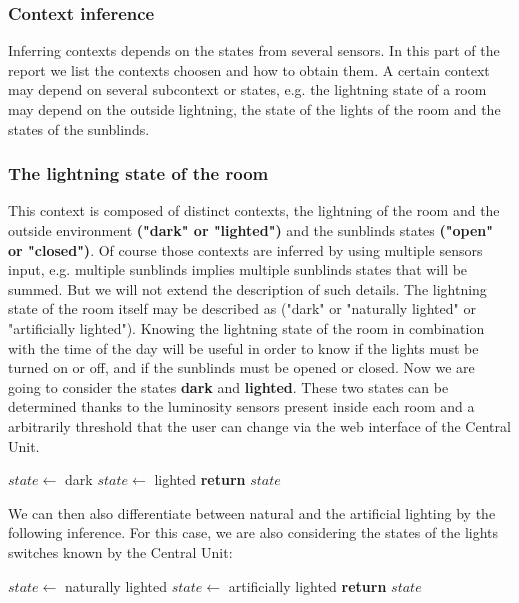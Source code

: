 \documentclass{acm_proc_article-sp}
\begin{document}
\subsubsection{Context inference}
Inferring contexts depends on the states from several sensors. In this part of the report we list the contexts choosen and how to obtain them.
A certain context may depend on several subcontext or states, 
e.g. the lightning state of a room may depend on the outside lightning, the state of the lights of the room and the states of the sunblinds.
\subsubsection*{The lightning state of the room}
 This context is composed of distinct contexts, the lightning of the room and the outside environment \textbf{("dark" or "lighted")} and the sunblinds states \textbf{("open" or "closed")}. 
 Of course those contexts are inferred by using multiple sensors input, e.g. multiple sunblinds implies multiple sunblinds states that will be summed. But we will not extend the description of such details.
 The lightning state of the room itself may be described as ("dark" or "naturally lighted" or "artificially lighted").
 Knowing the lightning state of the room in combination with the time of the day will be useful in order to know if the lights must be turned on or off, and if the sunblinds must be opened or closed. Now we are going to consider the states \textbf{dark} and \textbf{lighted}. These two states can be determined thanks to the luminosity sensors present inside each room and a arbitrarily threshold that the user can change via the web interface of the Central Unit.
 \begin{description}
  \begin{algorithm}
  \begin{algorithmic}
      \State $state\gets$ dark
    \Else
      \State $state\gets$ lighted
  \EndIf
  \State \textbf{return} $state$
  \end{algorithmic}
  \end{algorithm}
\end{description}
We can then also differentiate between natural and the artificial lighting by the following inference. For this case, we are also considering the states of the lights switches known by the Central Unit:
\begin{description}  
  \begin{algorithm}
  \begin{algorithmic}
	\State $state\gets$ naturally lighted
	\State $state\gets$ artificially lighted
      \EndIf
    \EndIf
  \State \textbf{return} $state$
  \end{algorithmic}
  \end{algorithm}
\end{description}
\end{document}
